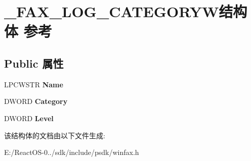 \hypertarget{struct___f_a_x___l_o_g___c_a_t_e_g_o_r_y_w}{}\section{\+\_\+\+F\+A\+X\+\_\+\+L\+O\+G\+\_\+\+C\+A\+T\+E\+G\+O\+R\+Y\+W结构体 参考}
\label{struct___f_a_x___l_o_g___c_a_t_e_g_o_r_y_w}
\subsection*{Public 属性}
\begin{DoxyCompactItemize}
\item 
\mbox{\label{struct___f_a_x___l_o_g___c_a_t_e_g_o_r_y_w_a19cf786622352dd485fd4addebccd165}} 
L\+P\+C\+W\+S\+TR {\bfseries Name}
\item 
\mbox{\label{struct___f_a_x___l_o_g___c_a_t_e_g_o_r_y_w_a301038437e132b6cefd96603fe637107}} 
D\+W\+O\+RD {\bfseries Category}
\item 
\mbox{\label{struct___f_a_x___l_o_g___c_a_t_e_g_o_r_y_w_ac03aea57823532f05bf74b7ccae4c66d}} 
D\+W\+O\+RD {\bfseries Level}
\end{DoxyCompactItemize}


该结构体的文档由以下文件生成\+:\begin{DoxyCompactItemize}
\item 
E\+:/\+React\+O\+S-\/0../sdk/include/psdk/winfax.\+h\end{DoxyCompactItemize}
